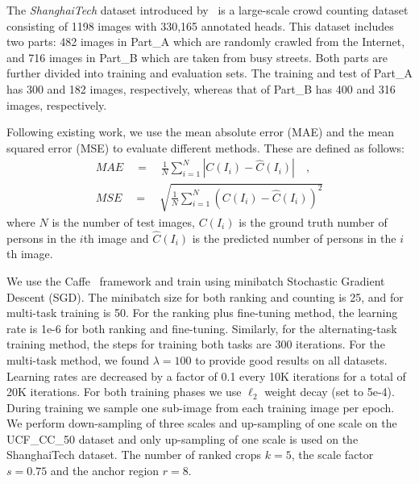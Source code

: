 \documentclass[10pt,twocolumn,letterpaper]{article}
\begin{document}
The \emph{ShanghaiTech} dataset introduced by~\cite{zhang2016single}
is a large-scale crowd counting dataset consisting of 1198 images with
330,165 annotated heads. This dataset includes two parts: 482 images
in Part\_A which are randomly crawled from the Internet, and 716
images in Part\_B which are taken from busy streets. Both parts are
further divided into training and evaluation sets. The training and
test of Part\_A has 300 and 182 images, respectively, whereas that of
Part\_B has 400 and 316 images, respectively.

Following existing work, we use the mean absolute
error (MAE) and the mean squared error (MSE) to evaluate different
methods. These are defined as follows:
\begin{equation}
\begin{aligned} 
MAE\quad =\quad \frac { 1 }{ N } \sum _{ i=1 }^{ N }{ \left| { C \left(I_i\right) }-{ \hat  C \left(I_i\right) } \right| \quad ,} \\ MSE\quad =\quad \sqrt { \frac { 1 }{ N } \sum _{ i=1 }^{ N }{ { \left( C \left(I_i\right)-{ \hat C \left(I_i\right)  } \right)  }^{ 2 } }  } 
\end{aligned}
\end{equation}
where $N$ is the number of test images, $C \left(I_i\right)$ is the
ground truth number of persons in the $i$th image and
$\hat C \left(I_i\right)$ is the predicted number of persons in the
$i$th image.


We use the Caffe~\cite{jia2014caffe} framework and train using
minibatch Stochastic Gradient Descent (SGD). The minibatch size for
both ranking and counting is 25, and for multi-task training is
50. For the ranking plus fine-tuning method, the learning rate is 1e-6
for both ranking and fine-tuning. Similarly, for the alternating-task
training method, the steps for training both tasks are 300
iterations. For the multi-task method, we found $\lambda=100$ to provide good results on all datasets. Learning rates are decreased by a factor
of 0.1 every 10K iterations for a total of 20K iterations. For both
training phases we use $\ell_2$ weight decay (set to 5e-4). During
training we sample one sub-image from each training image per
epoch. We perform down-sampling of three scales and up-sampling of one
scale on the UCF\_CC\_50 dataset and only up-sampling of one scale is
used on the ShanghaiTech dataset. The number of ranked crops $k=5$, the scale factor $s=0.75$ and the anchor region $r=8$.
\end{document}
